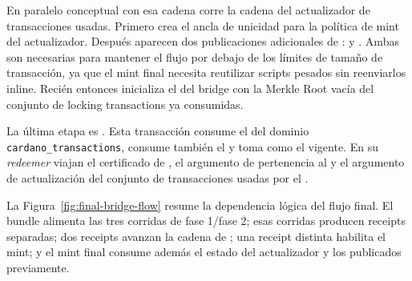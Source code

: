 En paralelo conceptual con esa cadena corre la cadena del actualizador de transacciones usadas. Primero \LockingTxsUpdaterSeedTxTemplate crea el ancla de unicidad para la política de mint del actualizador. Después aparecen dos publicaciones adicionales de \ReferenceScripts: \PublishMintingTxsUpdaterSpendReferenceScriptTx y \PublishBridgeMintingReferenceScriptTx. Ambas son necesarias para mantener el flujo por debajo de los límites de tamaño de transacción, ya que el mint final necesita reutilizar scripts pesados sin reenviarlos inline. Recién entonces \MintingTxsUpdaterSeedTxTemplate inicializa el \TxsUpdaterUTxO del bridge con la Merkle Root vacía del conjunto de locking transactions ya consumidas.

La última etapa es \BridgeMintTxTemplate. Esta transacción consume el \UTxO del dominio \texttt{cardano\_transactions}, consume también el \TxsUpdaterUTxO y toma como \ReferenceInput el \StakeDistributionUTxO vigente. En su \textit{redeemer} viajan el certificado de \TransactionSnapshot, el argumento \Groth de pertenencia al \Snapshot y el argumento \Groth de actualización del conjunto de transacciones usadas por el \zkBridge.

La Figura~\ref{fig:final-bridge-flow} resume la dependencia lógica del flujo final. El bundle \STM alimenta las tres corridas de fase 1/fase 2; esas corridas producen receipts separadas; dos receipts avanzan la cadena de \StakeDistribution; una receipt distinta habilita el mint; y el mint final consume además el estado del actualizador y los \ReferenceScripts publicados previamente.

